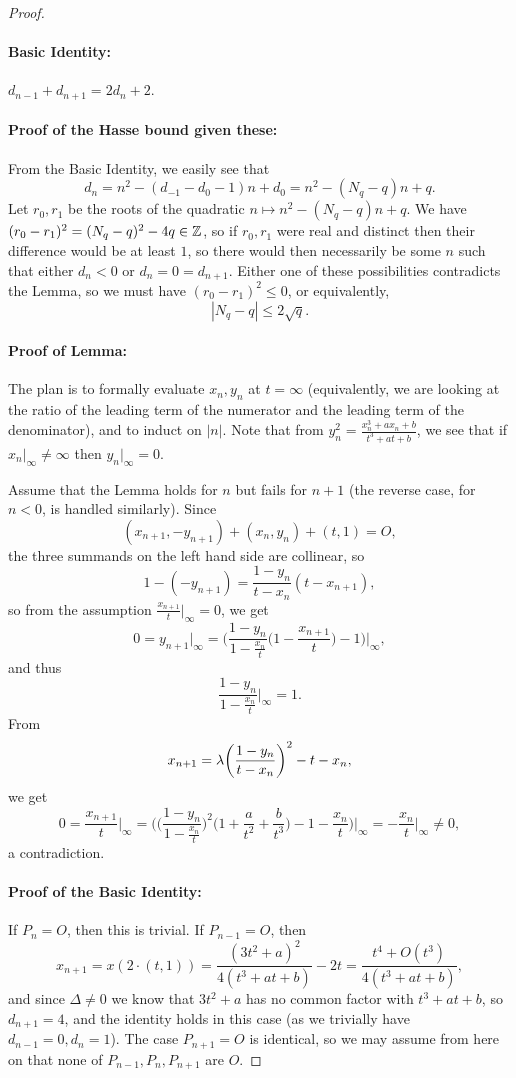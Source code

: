 \documentclass[letterpaper,11pt]{article}
\begin{document}
\begin{proof}
\paragraph{Basic Identity:} $d_{n-1} + d_{n+1} = 2d_n + 2$.
\paragraph{Proof of the Hasse bound given these:} From the Basic Identity, we easily see that
\[
d_n = n^2 - (d_{-1}-d_0-1)n + d_0 = n^2 - (N_q-q)n + q.
\]
Let $r_0, r_1$ be the roots of the quadratic $n\mapsto n^2 - (N_q-q)n + q$. We have $(r_0-r_1)^2 = (N_q-q)^2-4q \in \mathbb{Z}$, so if $r_0,r_1$ were real and distinct then their difference would be at least $1$, so there would then necessarily be some $n$ such that either $d_n < 0$ or $d_n = 0 = d_{n+1}$. Either one of these possibilities contradicts the Lemma, so we must have $(r_0-r_1)^2 \le 0$, or equivalently,
\[
|N_q-q| \le 2\sqrt{q}.
\]
\paragraph{Proof of Lemma:} The plan is to formally evaluate $x_n, y_n$ at $t=\infty$ (equivalently, we are looking at the ratio of the leading term of the numerator and the leading term of the denominator), and to induct on $|n|$. Note that from $y_n^2 = \frac{x_n^3+ax_n+b}{t^3+at+b}$, we see that if $x_n|_\infty \ne \infty$ then $y_n|_\infty = 0$.

Assume that the Lemma holds for $n$ but fails for $n+1$ (the reverse case, for $n < 0$, is handled similarly). Since
\[
(x_{n+1},-y_{n+1}) + (x_n,y_n) + (t,1) = O,
\]
the three summands on the left hand side are collinear, so
\[
1-(-y_{n+1}) = \frac{1-y_n}{t-x_n}(t-x_{n+1}),
\]
so from the assumption $\frac{x_{n+1}}{t}|_\infty = 0$, we get
\[
0 = y_{n+1}|_\infty = \bigg(\frac{1-y_n}{1-\frac{x_n}{t}}\Big(1-\frac{x_{n+1}}{t}\Big)-1\bigg)\bigg|_\infty,
\]
and thus
\[
\frac{1-y_n}{1-\frac{x_n}{t}}\Big|_\infty = 1.
\]
From
\[
x_{n+1} = \lambda\bigg(\frac{1-y_n}{t-x_n}\bigg)^2-t-x_n,
\]
we get
\[
0 = \frac{x_{n+1}}{t}\Big|_\infty = \bigg(\Big(\frac{1-y_n}{1-\frac{x_n}{t}}\Big)^2\Big(1 + \frac{a}{t^2} + \frac{b}{t^3}\Big) - 1 - \frac{x_n}{t}\bigg)\bigg|_\infty = -\frac{x_n}{t}\Big|_\infty \ne 0,
\]
a contradiction.
\paragraph{Proof of the Basic Identity:} If $P_n = O$, then this is trivial. If $P_{n-1} = O$, then
\[
x_{n+1} = x(2\cdot(t,1)) = \frac{(3t^2+a)^2}{4(t^3+at+b)} - 2t = \frac{t^4+O(t^3)}{4(t^3+at+b)},
\]
and since $\Delta \ne 0$ we know that $3t^2+a$ has no common factor with $t^3+at+b$, so $d_{n+1} = 4$, and the identity holds in this case (as we trivially have $d_{n-1} = 0, d_n = 1$). The case $P_{n+1} = O$ is identical, so we may assume from here on that none of $P_{n-1},P_n,P_{n+1}$ are $O$.


\end{proof}
\end{document}
